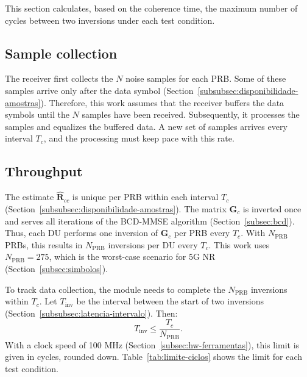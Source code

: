 This section calculates, based on the coherence time, the maximum number of cycles between two inversions under each test condition.

\subsection{\texorpdfstring{Sample collection}{Sample collection}}\label{subsec:pipeline}
The receiver first collects the $N$ noise samples for each PRB. Some of these samples arrive only after the data symbol (Section~\ref{subsubsec:disponibilidade-amostras}). Therefore, this work assumes that the receiver buffers the data symbols until the $N$ samples have been received. Subsequently, it processes the samples and equalizes the buffered data. A new set of samples arrives every interval $T_c$, and the processing must keep pace with this rate.

\subsection{Throughput}\label{subsec:restricao-vazao}
The estimate $\hat{\mathbf R}_{cc}$ is unique per PRB within each interval $T_c$ (Section~\ref{subsubsec:disponibilidade-amostras}). The matrix $\mathbf G_c$ is inverted once and serves all iterations of the BCD-MMSE algorithm (Section~\ref{subsec:bcd}). Thus, each DU performs one inversion of $\mathbf G_c$ per PRB every $T_c$. With $N_{\text{PRB}}$ PRBs, this results in $N_{\text{PRB}}$ inversions per DU every $T_c$. This work uses $N_{\text{PRB}} = 275$, which is the worst-case scenario for 5G NR (Section~\ref{subsec:simbolos}).

To track data collection, the module needs to complete the $N_{\text{PRB}}$ inversions within $T_c$. Let $T_{\text{inv}}$ be the interval between the start of two inversions (Section~\ref{subsubsec:latencia-intervalo}). Then:
\begin{equation}
{T_{\text{inv}} \leq \frac{T_c}{N_{\text{PRB}}}.}
\label{eq:restriction-flow}
\end{equation}
With a clock speed of 100 MHz (Section~\ref{subsec:hw-ferramentas}), this limit is given in cycles, rounded down. Table~\ref{tab:limite-ciclos} shows the limit for each test condition.


